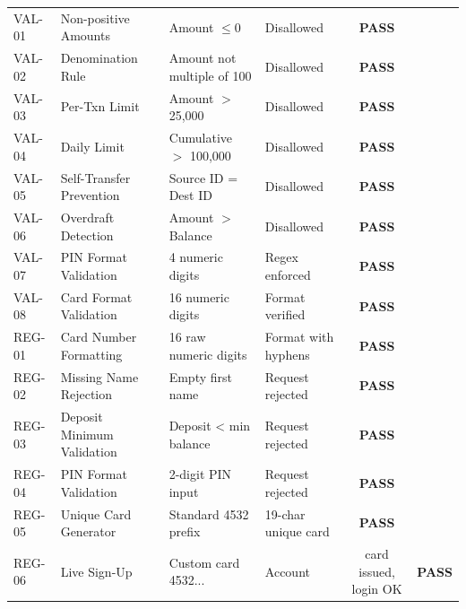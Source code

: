 \documentclass[11pt,a4paper]{report}
\begin{document}
\begin{longtable}{|l|p{4.8cm}|p{3.5cm}|p{3.2cm}|c|}
    VAL-01 & Non-positive Amounts & Amount $\le 0$ & Disallowed & \textbf{PASS} \\
    VAL-02 & Denomination Rule & Amount not multiple of 100 & Disallowed & \textbf{PASS} \\
    VAL-03 & Per-Txn Limit & Amount $>$ 25,000 & Disallowed & \textbf{PASS} \\
    VAL-04 & Daily Limit & Cumulative $>$ 100,000 & Disallowed & \textbf{PASS} \\
    VAL-05 & Self-Transfer Prevention & Source ID = Dest ID & Disallowed & \textbf{PASS} \\
    VAL-06 & Overdraft Detection & Amount $>$ Balance & Disallowed & \textbf{PASS} \\
    VAL-07 & PIN Format Validation & 4 numeric digits & Regex enforced & \textbf{PASS} \\
    VAL-08 & Card Format Validation & 16 numeric digits & Format verified & \textbf{PASS} \\

    REG-01 & Card Number Formatting & 16 raw numeric digits & Format with hyphens & \textbf{PASS} \\
    REG-02 & Missing Name Rejection & Empty first name & Request rejected & \textbf{PASS} \\
    REG-03 & Deposit Minimum Validation & Deposit < min balance & Request rejected & \textbf{PASS} \\
    REG-04 & PIN Format Validation & 2-digit PIN input & Request rejected & \textbf{PASS} \\
    REG-05 & Unique Card Generator & Standard 4532 prefix & 19-char unique card & \textbf{PASS} \\
    REG-06 & Live Sign-Up & Custom card 4532... & Account & card issued, login OK & \textbf{PASS} \\


\end{longtable}
\end{document}

